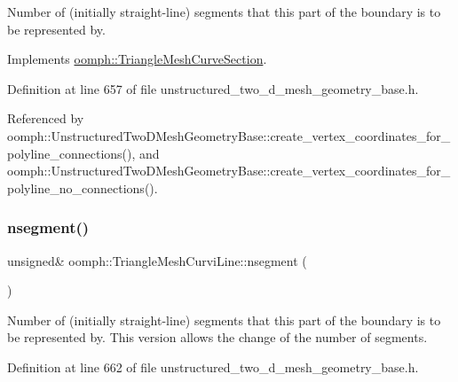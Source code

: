 Number of (initially straight-\/line) segments that this part of the boundary is to be represented by. 



Implements \hyperlink{classoomph_1_1TriangleMeshCurveSection_a52af59a9a4f1b6adb35e5645ab8feb45}{oomph\+::\+Triangle\+Mesh\+Curve\+Section}.



Definition at line 657 of file unstructured\+\_\+two\+\_\+d\+\_\+mesh\+\_\+geometry\+\_\+base.\+h.



Referenced by oomph\+::\+Unstructured\+Two\+D\+Mesh\+Geometry\+Base\+::create\+\_\+vertex\+\_\+coordinates\+\_\+for\+\_\+polyline\+\_\+connections(), and oomph\+::\+Unstructured\+Two\+D\+Mesh\+Geometry\+Base\+::create\+\_\+vertex\+\_\+coordinates\+\_\+for\+\_\+polyline\+\_\+no\+\_\+connections().

\mbox{\label{classoomph_1_1TriangleMeshCurviLine_a2f5337ebf1926262541b708799a597fa}} 
\subsubsection{\texorpdfstring{nsegment()}{nsegment()}\hspace{0.1cm}{\footnotesize\ttfamily [2/2]}}
{\footnotesize\ttfamily unsigned\& oomph\+::\+Triangle\+Mesh\+Curvi\+Line\+::nsegment (\begin{DoxyParamCaption}{ }\end{DoxyParamCaption})\hspace{0.3cm}{\ttfamily [inline]}}



Number of (initially straight-\/line) segments that this part of the boundary is to be represented by. This version allows the change of the number of segments. 



Definition at line 662 of file unstructured\+\_\+two\+\_\+d\+\_\+mesh\+\_\+geometry\+\_\+base.\+h.

\mbox{\label{classoomph_1_1TriangleMeshCurviLine_a4a60d6fadfae8165ed9fde9987ef4f0d}} 
